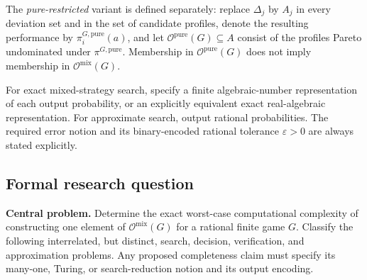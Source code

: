 \documentclass[11pt,a4paper]{article}
\begin{document}
The \emph{pure-restricted} variant is defined separately: replace $\Delta_j$ by $A_j$ in every deviation set and in the set of candidate profiles, denote the resulting performance by $\pi_i^{G,\mathrm{pure}}(a)$, and let $\mathcal O^{\mathrm{pure}}(G)\subseteq A$ consist of the profiles Pareto undominated under $\pi^{G,\mathrm{pure}}$. Membership in $\mathcal O^{\mathrm{pure}}(G)$ does not imply membership in $\mathcal O^{\mathrm{mix}}(G)$.

For exact mixed-strategy search, specify a finite algebraic-number representation of each output probability, or an explicitly equivalent exact real-algebraic representation. For approximate search, output rational probabilities. The required error notion and its binary-encoded rational tolerance $\varepsilon>0$ are always stated explicitly.

\subsection*{Formal research question}

\textbf{Central problem.} Determine the exact worst-case computational complexity of constructing one element of $\mathcal O^{\mathrm{mix}}(G)$ for a rational finite game $G$. Classify the following interrelated, but distinct, search, decision, verification, and approximation problems. Any proposed completeness claim must specify its many-one, Turing, or search-reduction notion and its output encoding.
\end{document}
